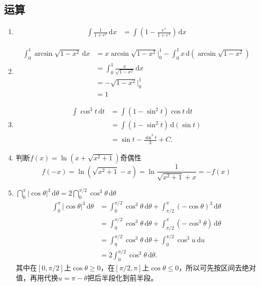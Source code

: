 \documentclass[../book.tex]{subfiles}
\begin{document}
    \subsection{运算}

    \begin{enumerate}
        \item
        \[
            \begin{aligned}
                \int \frac{1}{1+e^x}\,\mathrm{d}x
                &=
                \int \left(1 - \frac{e^x}{1+e^x}\right)\,\mathrm{d}x
            \end{aligned}
        \]

        \item
        \[
            \begin{aligned}
                \int_0^1 \arcsin \sqrt{1 - x^2}\,\mathrm{d}x
                &=
                x \arcsin \sqrt {1 - x^2}\Big|_0^1 - \int_0^1 x\,\mathrm{d}(\arcsin \sqrt{1 - x^2}) \\[6pt]
                &=
                \int_0^1 \frac{x}{\sqrt{1 - x^2}}\,\mathrm{d}x  \\[6pt]
                &=
                -\sqrt{1 - x^2}\Big|_0^1  \\[6pt]
                &=
                1
            \end{aligned}
        \]
        \item
        \[
            \begin{aligned}
                \int \cos^{3} t \,\mathrm{d}t
                &= \int (1 - \sin^2 t)\cos t \,\mathrm{d}t \\[6pt]
                &= \int (1-\sin^2 t)\,\mathrm{d}(\sin t) \\[6pt]
                &= \sin t - \frac{\sin^3 t}{3} + C.
            \end{aligned}
        \]

        \item 判断$f(x) = \ln (x + \sqrt{x^2 + 1})$奇偶性
        \[
            f(-x) = \ln (\sqrt{x^2 + 1} - x) = \ln \frac{1}{\sqrt{x^2 + 1} + x} = -f(x)
        \]
        \item $\dint_0^{\pi} |\cos \theta|^3\,\mathrm{d}\theta = 2\dint_0^{\pi/2} \cos^3 \theta\,\mathrm{d}\theta$
        \[
            \begin{aligned}
                \int_0^{\pi} |\cos \theta|^3\,\mathrm{d}\theta
                &= \int_0^{\pi/2} \cos^3 \theta\,\mathrm{d}\theta + \int_{\pi/2}^{\pi} (-\cos \theta)^3\,\mathrm{d}\theta \\
                &= \int_0^{\pi/2} \cos^3 \theta\,\mathrm{d}\theta + \int_{\pi/2}^{\pi} (-\cos^3 \theta)\,\mathrm{d}\theta \\
                &= \int_0^{\pi/2} \cos^3 \theta\,\mathrm{d}\theta + \int_0^{\pi/2} \cos^3 u\,\mathrm{d}u \\
                &= 2\int_0^{\pi/2} \cos^3 \theta\,\mathrm{d}\theta.
            \end{aligned}
        \]
        其中在$[0,\pi/2]$上$\cos\theta\ge 0$，在$[\pi/2,\pi]$上$\cos\theta\le 0$，所以可先按区间去绝对值，再用代换$u=\pi-\theta$把后半段化到前半段。


\end{enumerate}
\end{document}
